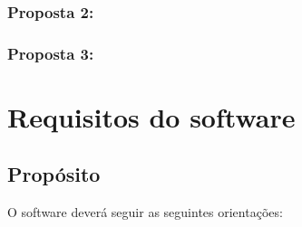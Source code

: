 \documentclass[a4paper,12pt]{report}
\begin{document}
            \subsection{Proposta 2:}

            \subsection{Proposta 3:}

    \appendix
    \chapter{Requisitos do software}

        \section{Propósito}
        O software deverá seguir as seguintes orientações:
\end{document}
